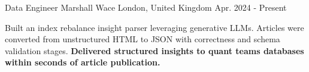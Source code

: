 

\begin{cventries}

  \cventry
    {Data Engineer} %
    {Marshall Wace} %
    {London, United Kingdom} %
    {Apr. 2024 - Present} %
    {
      \begin{cvitems} %
        \item {Built an index rebalance insight parser leveraging generative LLMs. Articles were converted from unstructured HTML to JSON with correctness and schema validation stages. \bf{Delivered structured insights to quant teams databases within seconds of article publication.}}
      \end{cvitems}
    }


\end{cventries}
